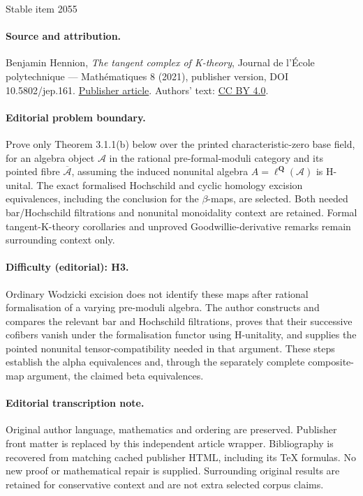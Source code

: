 \documentclass[11pt]{article}
\let\mathcal\mathscr
\theoremstyle{definition}
\begin{document}
\begin{center}{\Large Stable item 2055}\end{center}
\paragraph{Source and attribution.}
Benjamin Hennion, \emph{The tangent complex of K-theory}, Journal de l’École polytechnique — Mathématiques 8 (2021), publisher version, DOI 10.5802/jep.161. \href{https://jep.centre-mersenne.org/articles/10.5802/jep.161/}{Publisher article}. Authors' text: \href{https://creativecommons.org/licenses/by/4.0/}{CC BY 4.0}.
\paragraph{Editorial problem boundary.}
Prove only Theorem 3.1.1(b) below over the printed characteristic-zero base field, for an algebra object \(\mathcal A\) in the rational pre-formal-moduli category and its pointed fibre \(\overline{\mathcal A}\), assuming the induced nonunital algebra \(A=\ell^{\mathbf Q}(\mathcal A)\) is H-unital. The exact formalised Hochschild and cyclic homology excision equivalences, including the conclusion for the \(\beta\)-maps, are selected. Both needed bar/Hochschild filtrations and nonunital monoidality context are retained. Formal tangent-K-theory corollaries and unproved Goodwillie-derivative remarks remain surrounding context only.
\paragraph{Difficulty (editorial): H3.}
Ordinary Wodzicki excision does not identify these maps after rational formalisation of a varying pre-moduli algebra. The author constructs and compares the relevant bar and Hochschild filtrations, proves that their successive cofibers vanish under the formalisation functor using H-unitality, and supplies the pointed nonunital tensor-compatibility needed in that argument. These steps establish the alpha equivalences and, through the separately complete composite-map argument, the claimed beta equivalences.
\paragraph{Editorial transcription note.}
Original author language, mathematics and ordering are preserved. Publisher front matter is replaced by this independent article wrapper. Bibliography is recovered from matching cached publisher HTML, including its TeX formulas. No new proof or mathematical repair is supplied. Surrounding original results are retained for conservative context and are not extra selected corpus claims.
\clearpage
\end{document}
